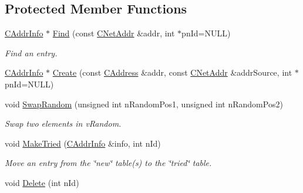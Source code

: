 \subsection*{Protected Member Functions}
\begin{DoxyCompactItemize}
\item 
\mbox{\label{class_c_addr_man_ac961ead1a1afde144fc486b6d7c7369d}} 
\mbox{\hyperlink{class_c_addr_info}{C\+Addr\+Info}} $\ast$ \mbox{\hyperlink{class_c_addr_man_ac961ead1a1afde144fc486b6d7c7369d}{Find}} (const \mbox{\hyperlink{class_c_net_addr}{C\+Net\+Addr}} \&addr, int $\ast$pn\+Id=N\+U\+LL)
\begin{DoxyCompactList}\small\item\em Find an entry. \end{DoxyCompactList}\item 
\mbox{\hyperlink{class_c_addr_info}{C\+Addr\+Info}} $\ast$ \mbox{\hyperlink{class_c_addr_man_aac93f51c0580e38a950a0f63b053bedb}{Create}} (const \mbox{\hyperlink{class_c_address}{C\+Address}} \&addr, const \mbox{\hyperlink{class_c_net_addr}{C\+Net\+Addr}} \&addr\+Source, int $\ast$pn\+Id=N\+U\+LL)
\item 
\mbox{\label{class_c_addr_man_a3074bc8e3dcfb5348054613f575dc38e}} 
void \mbox{\hyperlink{class_c_addr_man_a3074bc8e3dcfb5348054613f575dc38e}{Swap\+Random}} (unsigned int n\+Random\+Pos1, unsigned int n\+Random\+Pos2)
\begin{DoxyCompactList}\small\item\em Swap two elements in v\+Random. \end{DoxyCompactList}\item 
\mbox{\label{class_c_addr_man_a98e8383efb48b7c2932795438f35a10a}} 
void \mbox{\hyperlink{class_c_addr_man_a98e8383efb48b7c2932795438f35a10a}{Make\+Tried}} (\mbox{\hyperlink{class_c_addr_info}{C\+Addr\+Info}} \&info, int n\+Id)
\begin{DoxyCompactList}\small\item\em Move an entry from the \char`\"{}new\char`\"{} table(s) to the \char`\"{}tried\char`\"{} table. \end{DoxyCompactList}\item 
\mbox{\label{class_c_addr_man_af488eac123030538770dbc4e3b16eb74}} 
void \mbox{\hyperlink{class_c_addr_man_af488eac123030538770dbc4e3b16eb74}{Delete}} (int n\+Id)

\end{DoxyCompactItemize}
